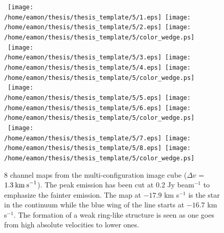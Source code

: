 \begin{figure}[htp]
\centering
\mbox{
          \texttt{[image: /home/eamon/thesis/thesis\_template/5/1.eps]}
          \texttt{[image: /home/eamon/thesis/thesis\_template/5/2.eps]}
         \texttt{[image: /home/eamon/thesis/thesis\_template/5/color\_wedge.ps]}
          }
\mbox{
          \texttt{[image: /home/eamon/thesis/thesis\_template/5/3.eps]}
          \texttt{[image: /home/eamon/thesis/thesis\_template/5/4.eps]}
          \texttt{[image: /home/eamon/thesis/thesis\_template/5/color\_wedge.ps]}
          }
\mbox{
          \texttt{[image: /home/eamon/thesis/thesis\_template/5/5.eps]}
          \texttt{[image: /home/eamon/thesis/thesis\_template/5/6.eps]}
          \texttt{[image: /home/eamon/thesis/thesis\_template/5/color\_wedge.ps]}
          }
\mbox{
          \texttt{[image: /home/eamon/thesis/thesis\_template/5/7.eps]}
          \texttt{[image: /home/eamon/thesis/thesis\_template/5/8.eps]}
          \texttt{[image: /home/eamon/thesis/thesis\_template/5/color\_wedge.ps]}
          }                           
\caption[Channel maps from the multi-configuration image cube]{8 channel maps from the multi-configuration image cube ($\Delta v$ = $1.3\>{\rm km\>s}^{-1}$). The peak emission has been cut at 0.2 Jy beam${{}^{-1}}$ to emphasize the fainter emission. The map at $-17.9$ km s$^{-1}$ is the star in the continuum while the blue wing of the line starts at $-16.7$ km s$^{-1}$. The formation of a weak ring-like structure is seen as one goes from high absolute velocities to lower ones.}
\label{fig:5.7}
\end{figure}

